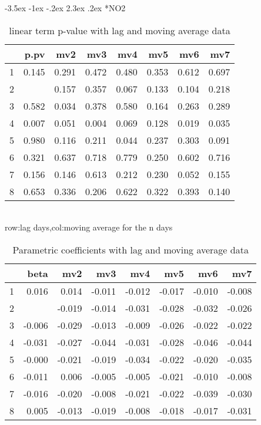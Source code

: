 \documentclass[a4paper, 12pt]{article}
\makeatletter
\def\large{\fontsize{14}{20}\selectfont}
\renewcommand\subsection{\@startsection {subsection}{1}{\z@}%
                                   {-3.5ex \@plus -1ex \@minus -.2ex}%
                                   {2.3ex \@plus.2ex}%
                                   {\centering\normalfont\large\bfseries}}
\makeatother
\begin{document}
\subsection*{NO2}
\begin{table}[h]
\centering
\caption{linear term p-value with lag and moving average data}
\begin{tabular}{rrrrrrrr}
  \hline
 & p.pv & mv2 & mv3 & mv4 & mv5 & mv6 & mv7 \\
  \hline
1 & 0.145 & 0.291 & 0.472 & 0.480 & 0.353 & 0.612 & 0.697 \\
  2 & \color{red}{0.000} & 0.157 & 0.357 & 0.067 & 0.133 & 0.104 & 0.218 \\
  3 & 0.582 & 0.034 & 0.378 & 0.580 & 0.164 & 0.263 & 0.289 \\
  4 & 0.007 & 0.051 & 0.004 & 0.069 & 0.128 & 0.019 & 0.035 \\
  5 & 0.980 & 0.116 & 0.211 & 0.044 & 0.237 & 0.303 & 0.091 \\
  6 & 0.321 & 0.637 & 0.718 & 0.779 & 0.250 & 0.602 & 0.716 \\
  7 & 0.156 & 0.146 & 0.613 & 0.212 & 0.230 & 0.052 & 0.155 \\
  8 & 0.653 & 0.336 & 0.206 & 0.622 & 0.322 & 0.393 & 0.140 \\
   \hline
\end{tabular}
\\row:lag days,col:moving average for the n days
\end{table}

\begin{table}[h]
\centering
\caption{Parametric coefficients with lag and moving average data}
\begin{tabular}{rrrrrrrr}
  \hline
 & beta & mv2 & mv3 & mv4 & mv5 & mv6 & mv7 \\
  \hline
1 & 0.016 & 0.014 & -0.011 & -0.012 & -0.017 & -0.010 & -0.008 \\
  2 & \color{red}{-0.041} & -0.019 & -0.014 & -0.031 & -0.028 & -0.032 & -0.026 \\
  3 & -0.006 & -0.029 & -0.013 & -0.009 & -0.026 & -0.022 & -0.022 \\
  4 & -0.031 & -0.027 & -0.044 & -0.031 & -0.028 & -0.046 & -0.044 \\
  5 & -0.000 & -0.021 & -0.019 & -0.034 & -0.022 & -0.020 & -0.035 \\
  6 & -0.011 & 0.006 & -0.005 & -0.005 & -0.021 & -0.010 & -0.008 \\
  7 & -0.016 & -0.020 & -0.008 & -0.021 & -0.022 & -0.039 & -0.030 \\
  8 & 0.005 & -0.013 & -0.019 & -0.008 & -0.018 & -0.017 & -0.031 \\
   \hline
\end{tabular}
\end{table}
\end{document}
